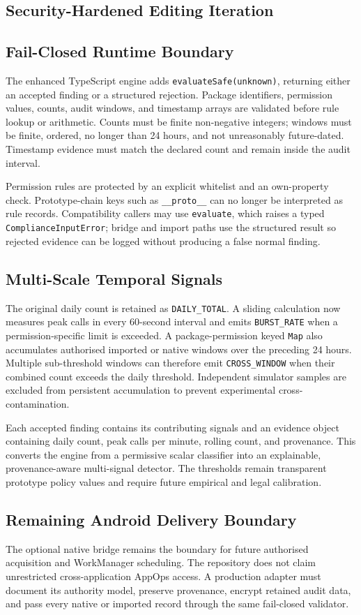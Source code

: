 
\subsection{Security-Hardened Editing Iteration}
\subsection{Fail-Closed Runtime Boundary}
The enhanced TypeScript engine adds \texttt{evaluateSafe(unknown)}, returning either an accepted finding or a structured rejection. Package identifiers, permission values, counts, audit windows, and timestamp arrays are validated before rule lookup or arithmetic. Counts must be finite non-negative integers; windows must be finite, ordered, no longer than 24 hours, and not unreasonably future-dated. Timestamp evidence must match the declared count and remain inside the audit interval.

Permission rules are protected by an explicit whitelist and an own-property check. Prototype-chain keys such as \texttt{\_\_proto\_\_} can no longer be interpreted as rule records. Compatibility callers may use \texttt{evaluate}, which raises a typed \texttt{ComplianceInputError}; bridge and import paths use the structured result so rejected evidence can be logged without producing a false normal finding.

\subsection{Multi-Scale Temporal Signals}
The original daily count is retained as \texttt{DAILY\_TOTAL}. A sliding calculation now measures peak calls in every 60-second interval and emits \texttt{BURST\_RATE} when a permission-specific limit is exceeded. A package-permission keyed \texttt{Map} also accumulates authorised imported or native windows over the preceding 24 hours. Multiple sub-threshold windows can therefore emit \texttt{CROSS\_WINDOW} when their combined count exceeds the daily threshold. Independent simulator samples are excluded from persistent accumulation to prevent experimental cross-contamination.

Each accepted finding contains its contributing signals and an evidence object containing daily count, peak calls per minute, rolling count, and provenance. This converts the engine from a permissive scalar classifier into an explainable, provenance-aware multi-signal detector. The thresholds remain transparent prototype policy values and require future empirical and legal calibration.

\subsection{Remaining Android Delivery Boundary}
The optional native bridge remains the boundary for future authorised acquisition and WorkManager scheduling. The repository does not claim unrestricted cross-application AppOps access. A production adapter must document its authority model, preserve provenance, encrypt retained audit data, and pass every native or imported record through the same fail-closed validator.
